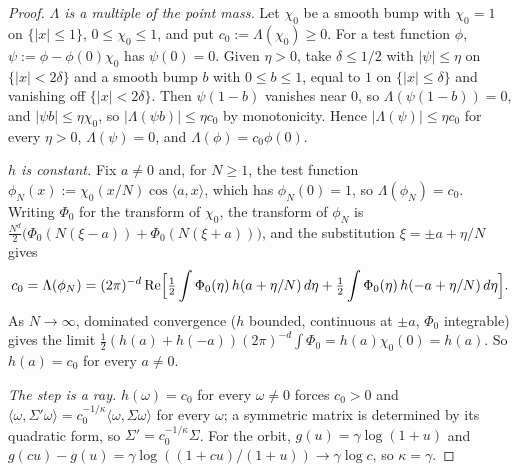 \begin{proof}
\emph{$\Lambda$ is a multiple of the point mass.} Let $\chi_0$ be a smooth bump with $\chi_0 = 1$ on
$\{|x| \le 1\}$, $0 \le \chi_0 \le 1$, and put $c_0 := \Lambda(\chi_0) \ge 0$. For a test function $\phi$,
$\psi := \phi - \phi(0)\chi_0$ has $\psi(0) = 0$. Given $\eta > 0$, take $\delta \le 1/2$ with
$|\psi| \le \eta$ on $\{|x| < 2\delta\}$ and a smooth bump $b$ with $0 \le b \le 1$, equal to $1$ on
$\{|x| \le \delta\}$ and vanishing off $\{|x| < 2\delta\}$. Then $\psi(1 - b)$ vanishes near $0$, so $\Lambda(\psi(1 - b)) = 0$, and
$|\psi b| \le \eta\chi_0$, so $|\Lambda(\psi b)| \le \eta c_0$ by monotonicity. Hence $|\Lambda(\psi)| \le \eta c_0$
for every $\eta > 0$, $\Lambda(\psi) = 0$, and $\Lambda(\phi) = c_0\phi(0)$.

\emph{$h$ is constant.} Fix $a \ne 0$ and, for $N \ge 1$, the test function
$\phi_N(x) := \chi_0(x/N)\cos\langle a,x\rangle$, which has $\phi_N(0) = 1$, so $\Lambda(\phi_N) = c_0$.
Writing $\Phi_0$ for the transform of $\chi_0$, the transform of $\phi_N$ is
$\frac{N^d}{2}\bigl(\Phi_0(N(\xi - a)) + \Phi_0(N(\xi + a))\bigr)$, and the substitution
$\xi = \pm a + \eta/N$ gives
\[
  c_0 = \Lambda(\phi_N) = (2\pi)^{-d}\,\mathrm{Re}\Bigl[\tfrac12\int\Phi_0(\eta)\,h(a + \eta/N)\,d\eta
    + \tfrac12\int\Phi_0(\eta)\,h(-a + \eta/N)\,d\eta\Bigr] .
\]
As $N \to \infty$, dominated convergence ($h$ bounded, continuous at $\pm a$, $\Phi_0$ integrable) gives
the limit $\tfrac12(h(a) + h(-a))(2\pi)^{-d}\int\Phi_0 = h(a)\chi_0(0) = h(a)$. So $h(a) = c_0$ for every
$a \ne 0$.

\emph{The step is a ray.} $h(\omega) = c_0$ for every $\omega \ne 0$ forces $c_0 > 0$ and
$\langle\omega,\Sigma'\omega\rangle = c_0^{-1/\kappa}\langle\omega,\Sigma\omega\rangle$ for every
$\omega$; a symmetric matrix is determined by its quadratic form, so $\Sigma' = c_0^{-1/\kappa}\Sigma$.
For the \Matern{} orbit, $g(u) = \gamma\log(1+u)$ and $g(cu) - g(u) = \gamma\log((1+cu)/(1+u))
\to \gamma\log c$, so $\kappa = \gamma$.
\end{proof}

